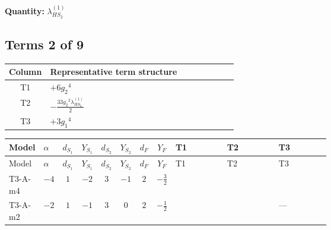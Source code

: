 \documentclass[8pt]{article}
\begin{document}
\begin{landscape}
\begin{longtable}{@{}llcccccc >{\raggedright\arraybackslash}p{0.21\linewidth} >{\raggedright\arraybackslash}p{0.21\linewidth} >{\raggedright\arraybackslash}p{0.21\linewidth}@{}}
\midrule
\bottomrule
\end{longtable}
\clearpage
\noindent\textbf{Quantity: }$\lambda_{HS_2}^{(1)}$\par\smallskip
\subsection*{Terms 2 of 9}
\begin{center}
\begin{tabular}{@{}c >{\raggedright\arraybackslash}p{0.82\linewidth}@{}}
\toprule
Column & Representative term structure \\
\midrule
T1 & \(\displaystyle +6 {g_2}^4\) \\
\midrule
T2 & \(\displaystyle -\frac{33 {g_2}^2 {\lambda_{HS_2}^{(1)}}}{2}\) \\
\midrule
T3 & \(\displaystyle +3 {g_1}^4\) \\
\midrule
\bottomrule
\end{tabular}
\end{center}
\smallskip
\tiny
\begin{longtable}{@{}llcccccc >{\raggedright\arraybackslash}p{0.21\linewidth} >{\raggedright\arraybackslash}p{0.21\linewidth} >{\raggedright\arraybackslash}p{0.21\linewidth}@{}}
\toprule
Model & $\alpha$ & $d_{S_1}$ & $Y_{S_1}$ & $d_{S_2}$ & $Y_{S_2}$ & $d_F$ & $Y_F$ & T1 & T2 & T3 \\
\midrule
\endfirsthead
\toprule
Model & $\alpha$ & $d_{S_1}$ & $Y_{S_1}$ & $d_{S_2}$ & $Y_{S_2}$ & $d_F$ & $Y_F$ & T1 & T2 & T3 \\
\midrule
\endhead
T3-A-m4 & $-4$ & $1$ & $-2$ & $3$ & $-1$ & $2$ & $-\frac{3}{2}$ & \scriptsize\adjustbox{max width=\linewidth}{$\begin{gathered} +6 {g_2}^4\end{gathered}$} & \scriptsize\adjustbox{max width=\linewidth}{$\begin{gathered} -\frac{33 {g_2}^2 {\lambda_{HS_2}^{(1)}}}{2}\end{gathered}$} & \scriptsize\adjustbox{max width=\linewidth}{$\begin{gathered} +3 {g_1}^4\end{gathered}$} \\
\midrule
T3-A-m2 & $-2$ & $1$ & $-1$ & $3$ & $0$ & $2$ & $-\frac{1}{2}$ & \scriptsize\adjustbox{max width=\linewidth}{$\begin{gathered} +6 {g_2}^4\end{gathered}$} & \scriptsize\adjustbox{max width=\linewidth}{$\begin{gathered} -\frac{33 {g_2}^2 {\lambda_{HS_2}^{(1)}}}{2}\end{gathered}$} & --- \\

\end{longtable}
\end{landscape}
\end{document}
